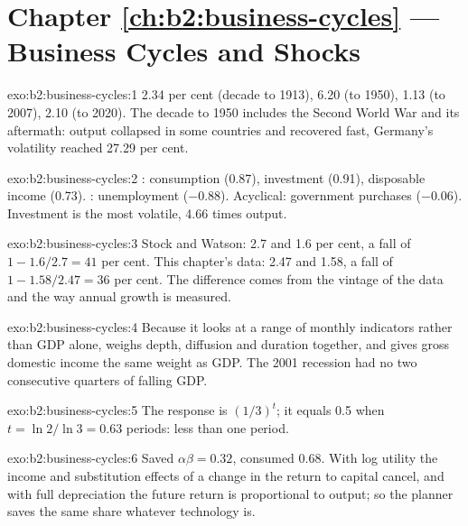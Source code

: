 \section*{Chapter \ref{ch:b2:business-cycles} --- Business Cycles and Shocks}

\begin{solution}{exo:b2:business-cycles:1}
2.34 per cent (decade to 1913), 6.20 (to 1950), 1.13 (to 2007), 2.10 (to 2020). The decade to 1950 includes the Second World War and its
aftermath: output collapsed in some countries and recovered fast, Germany's volatility reached 27.29 per cent.
\end{solution}

\begin{solution}{exo:b2:business-cycles:2}
: consumption (0.87), investment (0.91), disposable income (0.73). : unemployment ($-0.88$). Acyclical:
government purchases ($-0.06$). Investment is the most volatile, 4.66 times output.
\end{solution}

\begin{solution}{exo:b2:business-cycles:3}
Stock and Watson: 2.7 and 1.6 per cent, a fall of $1 - 1.6/2.7 = 41$ per cent. This chapter's data: 2.47 and 1.58, a fall of $1 - 1.58/2.47 = 36$ per cent. The difference comes from the
vintage of the data and the way annual growth is measured.
\end{solution}

\begin{solution}{exo:b2:business-cycles:4}
Because it looks at a range of monthly indicators rather than GDP alone, weighs depth, diffusion and duration together,
and gives gross domestic income the same weight as GDP. The 2001 recession had no two consecutive quarters of falling GDP.
\end{solution}

\begin{solution}{exo:b2:business-cycles:5}
The response is $(1/3)^t$; it equals 0.5 when $t = \ln 2/\ln 3 = 0.63$ periods: less than one period.
\end{solution}

\begin{solution}{exo:b2:business-cycles:6}
Saved $\alpha\beta = 0.32$, consumed 0.68. With log utility the income and substitution effects of a change in the return to capital
cancel, and with full depreciation the future return is proportional to output; so the planner saves the same share whatever technology is.
\end{solution}

